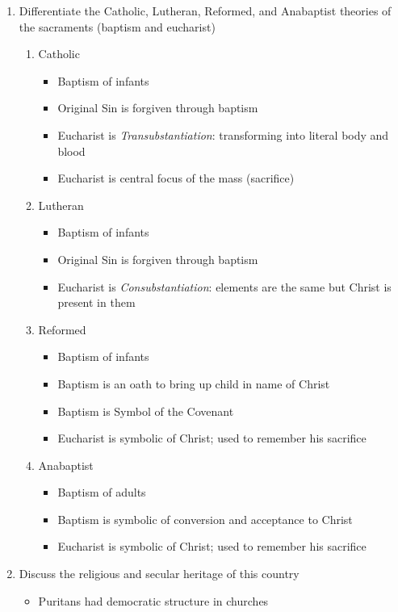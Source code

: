 \documentclass[8pt]{article}
\begin{document}
\begin{enumerate}
    \item Differentiate the Catholic, Lutheran, Reformed, and Anabaptist theories of the sacraments (baptism and eucharist)
    \begin{enumerate}
        \item Catholic
        \begin{itemize}
            \item Baptism of infants
            \item Original Sin is forgiven through baptism
            \item Eucharist is \textit{Transubstantiation}: transforming into literal body and blood
            \item Eucharist is central focus of the mass (sacrifice)
        \end{itemize}
        \item Lutheran
        \begin{itemize}
            \item Baptism of infants
            \item Original Sin is forgiven through baptism
            \item Eucharist is \textit{Consubstantiation}: elements are the same but Christ is present in them
        \end{itemize}
        \item Reformed
        \begin{itemize}
            \item Baptism of infants
            \item Baptism is an oath to bring up child in name of Christ
            \item Baptism is Symbol of the Covenant
            \item Eucharist is symbolic of Christ; used to remember his sacrifice
        \end{itemize}
        \item Anabaptist
        \begin{itemize}
            \item Baptism of adults
            \item Baptism is symbolic of conversion and acceptance to Christ
            \item Eucharist is symbolic of Christ; used to remember his sacrifice
        \end{itemize}
    \end{enumerate}

    \item Discuss the religious and secular heritage of this country
    \begin{itemize}
        \item Puritans had democratic structure in churches


\end{itemize}
\end{enumerate}
\end{document}
